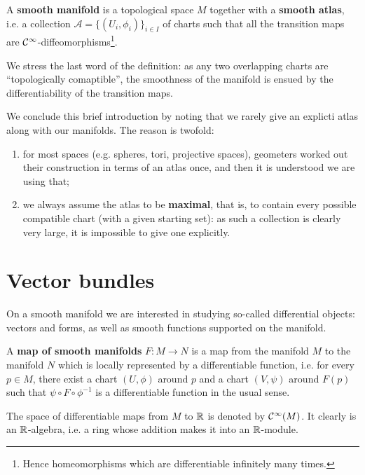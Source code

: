 \begin{definition}
	A \textbf{smooth manifold} is a topological space $M$ together with a \textbf{smooth atlas}, i.e. a collection $\mathcal A = \{(U_i, \phi_i)\}_{i \in I}$ of charts such that all the transition maps are $\mathcal{C}^\infty$-diffeomorphisms\footnote{Hence homeomorphisms which are differentiable infinitely many times.}.
\end{definition}

\begin{remark}
	We stress the last word of the definition: as any two overlapping charts are ``topologically comaptible'', the smoothness of the manifold is ensued by the differentiability of the transition maps.
\end{remark}

We conclude this brief introduction by noting that we rarely give an explicti atlas along with our manifolds. The reason is twofold:
\begin{enumerate}
	\item for most spaces (e.g. spheres, tori, projective spaces), geometers worked out their construction in terms of an atlas once, and then it is understood we are using that;
	\item we always assume the atlas to be \textbf{maximal}, that is, to contain every possible compatible chart (with a given starting set): as such a collection is clearly very large, it is impossible to give one explicitly.
\end{enumerate}

\section{Vector bundles}
On a smooth manifold we are interested in studying so-called differential objects: vectors and forms, as well as smooth functions supported on the manifold.

\begin{definition}
	A \textbf{map of smooth manifolds} $F:M \to N$ is a map from the manifold $M$ to the manifold $N$ which is locally represented by a differentiable function, i.e. for every $p \in M$, there exist a chart $(U, \phi)$ around $p$ and a chart $(V, \psi)$ around $F(p)$ such that $\psi \circ F \circ \phi^{-1}$ is a differentiable function in the usual sense.
\end{definition}

The space of differentiable maps from $M$ to $\mathbb{R}$ is denoted by $\mathcal{C}^\infty(M)$. It clearly is an $\mathbb{R}$-algebra, i.e. a ring whose addition makes it into an $\mathbb{R}$-module.

